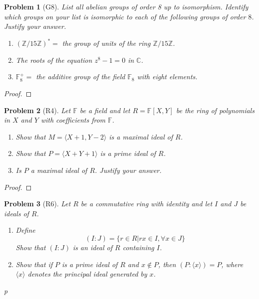 \documentclass[10pt]{article}
\newcommand{\sk}{\vskip 10mm}
\newcommand{\bb}[1]{\mathbb{#1}}
\theoremstyle{plain}
\newtheorem{problem}{Problem}
\theoremstyle{remark}
\begin{document}
\sk


\begin{problem}[G8]
  List all abelian groups of order 8 up to isomorphism. Identify which groups on
  your list is isomorphic to each of the following groups of order $8$. Justify
  your answer.
  \begin{enumerate}
  \item $(\bb{Z}/15\bb{Z})^*=$ the group of units of the ring $\bb{Z}/15\bb{Z}$.
  \item The roots of the equation $z^8-1=0$ in $\bb{C}$.
  \item $\bb{F}_8^+=$ the additive group of the field $\bb{F}_8$ with
    eight elements.
  \end{enumerate}
\end{problem}

\begin{proof}
  
\end{proof}

\sk


\begin{problem}[R4]
  Let $\bb{F}$ be a field and let $R=\bb{F}[X,Y]$ be the ring of polynomials
  in $X$ and $Y$ with coefficients from $\bb{F}$.
  \begin{enumerate}
  \item Show that $M=\langle X+1,Y-2\rangle$ is a maximal ideal of $R$.
  \item Show that $P=\langle X+Y+1\rangle$ is a prime ideal of $R$.
  \item Is $P$ a maximal ideal of $R$. Justify your answer.
  \end{enumerate}
\end{problem}

\begin{proof}
  
\end{proof}

\sk


\begin{problem}[R6]
  Let $R$ be a commutative ring with identity and let $I$ and $J$
  be ideals of $R$.
  \begin{enumerate}
  \item Define
    \[ (I:J)=\{r\in R|rx\in I, \forall x\in J\} \]
    Show that $(I:J)$ is an ideal of $R$ containing $I$.
  \item Show that if $P$ is a prime ideal of $R$ and $x\notin P$,
    then $(P:\langle x\rangle)=P$, where $\langle x\rangle$ denotes the
    principal ideal generated by $x$.
  \end{enumerate}
p\end{problem}
\end{document}
